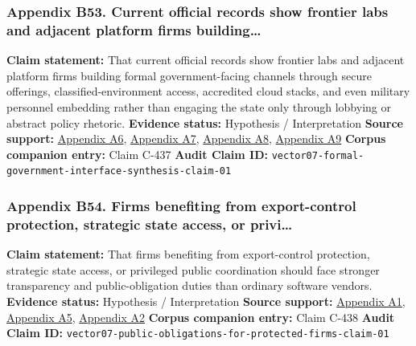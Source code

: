 \documentclass[
  american,
  11pt,
  letterpaper,
]{article}
\begin{document}
\subsubsection{Appendix B53. Current official records show frontier labs
and adjacent platform firms
building\ldots{}}\label{ch-07-appendix-b53-current-official-records-show-frontier-labs-and-adjacent-platform-firms-building}

\textbf{Claim statement:} That current official records show frontier
labs and adjacent platform firms building formal government-facing
channels through secure offerings, classified-environment access,
accredited cloud stacks, and even military personnel embedding rather
than engaging the state only through lobbying or abstract policy
rhetoric. \textbf{Evidence status:} Hypothesis / Interpretation
\textbf{Source support:}
\hyperref[ch-07-appendix-a6-introducing-openai-for-government]{Appendix
A6},
\hyperref[ch-07-appendix-a7-claude-gov-models-for-u-s-national-security-customers]{Appendix
A7},
\hyperref[ch-07-appendix-a8-anthropic-and-palantir-partner-to-bring-claude-ai-models-to-aws-for-u-s-government-intelligence-and-defense-operations]{Appendix
A8},
\hyperref[ch-07-appendix-a9-army-launches-detachment-201-executive-innovation-corps-to-drive-tech-transformation]{Appendix
A9} \textbf{Corpus companion entry:} Claim C-437 \textbf{Audit Claim
ID:} \texttt{vector07-formal-government-interface-synthesis-claim-01}

\subsubsection{Appendix B54. Firms benefiting from export-control
protection, strategic state access, or
privi\ldots{}}\label{ch-07-appendix-b54-firms-benefiting-from-export-control-protection-strategic-state-access-or-privi}

\textbf{Claim statement:} That firms benefiting from export-control
protection, strategic state access, or privileged public coordination
should face stronger transparency and public-obligation duties than
ordinary software vendors. \textbf{Evidence status:} Hypothesis /
Interpretation \textbf{Source support:}
\hyperref[ch-07-appendix-a1-removing-barriers-to-american-leadership-in-artificial-intelligence]{Appendix
A1},
\hyperref[ch-07-appendix-a5-openais-proposals-for-the-us-ai-action-plan]{Appendix
A5},
\hyperref[ch-07-appendix-a2-guidance-regarding-enforcement-of-license-requirements-for-advanced-computing-items-for-entities-headquartered-in-country-group-d-5-and-macau]{Appendix
A2} \textbf{Corpus companion entry:} Claim C-438 \textbf{Audit Claim
ID:} \texttt{vector07-public-obligations-for-protected-firms-claim-01}
\end{document}
